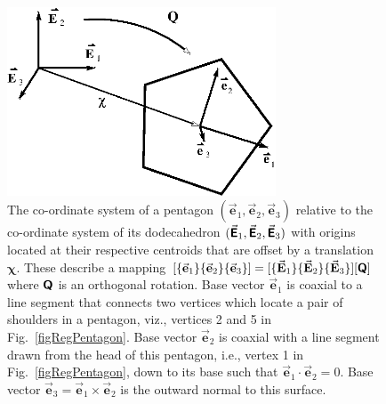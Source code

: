 \begin{figure}
    \centering
    \includegraphics[width=8cm]{figures/pentagonCoord.png}
    \caption{The co-ordinate system of a pentagon $( \vec{\mathbf{e}}_1 , \vec{\mathbf{e}}_2 , \vec{\mathbf{e}}_3 )$ relative to the co-ordinate system of its dodecahedron $( \vec{\boldsymbol{\mathsf{E}}}_1 , \vec{\boldsymbol{\mathsf{E}}}_2 , \vec{\boldsymbol{\mathsf{E}}}_3 )$ with origins located at their respective centroids that are offset by a translation $\boldsymbol{\chi}$.  These describe a mapping $[ \{ \vec{\mathbf{e}}_1 \} \{ \vec{\mathbf{e}}_2 \} \{ \vec{\mathbf{e}}_3 \} ] = [ \{ \vec{\mathbf{E}}_1 \} \{ \vec{\mathbf{E}}_2 \} \{ \vec{\mathbf{E}}_3 \} ] [ \boldsymbol{\mathsf{Q}} ]$ where $\boldsymbol{\mathsf{Q}}$ is an orthogonal rotation.  Base vector $\vec{\mathbf{e}}_1$ is coaxial to a line segment that connects two vertices which locate a pair of shoulders in a pentagon, viz., vertices 2 and 5 in Fig.~\ref{figRegPentagon}.  Base vector $\vec{\mathbf{e}}_2$ is coaxial with a line segment drawn from the head of this pentagon, i.e., vertex 1 in Fig.~\ref{figRegPentagon}, down to its base such that $\vec{\mathbf{e}}_1 \cdot \vec{\mathbf{e}}_2 = 0$.  Base vector $\vec{\mathbf{e}}_3 = \vec{\mathbf{e}}_1 \times \vec{\mathbf{e}}_2$ is the outward normal to this surface.}
    \label{figPentagonCoord}
\end{figure}

